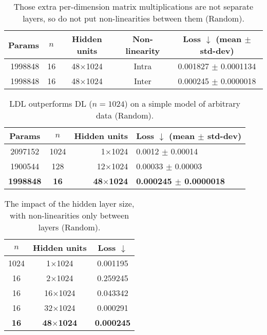 \documentclass{article}
\begin{document}
\begin{table}
\begin{center}
\begin{tabular}{rcccc}
\hline
Params & $n$ & Hidden units & Non-linearity & Loss $\downarrow$ (mean $\pm$ std-dev) \\
\hline
1998848 & 16 & 48$\times$1024 & Intra & 0.001827 $\pm$ 0.0001134 \\
1998848 & 16 & 48$\times$1024 & Inter & 0.000245 $\pm$ 0.0000018 \\
\hline
\end{tabular}
\end{center}
\caption{Those extra per-dimension matrix multiplications are not separate layers, so do not put non-linearities between them (Random).}
\label{LDLintraVSinter}
\end{table}

\begin{table}
\begin{center}
\begin{tabular}{ccrl}
\hline
Params & $n$ & Hidden units & Loss $\downarrow$ (mean $\pm$ std-dev) \\
\hline
2097152 & 1024 & 1$\times$1024 & 0.0012 $\pm$ 0.00014 \\
1900544 & 128 & 12$\times$1024 & 0.00033 $\pm$ 0.00003 \\
\textbf{1998848} & \textbf{16} & \textbf{48$\times$1024} & \textbf{0.000245 $\pm$ 0.0000018} \\
\hline
\end{tabular}
\end{center}
\caption{LDL outperforms DL ($n=1024$) on a simple model of arbitrary data (Random).}
\label{randomLDLvsDL}
\end{table}

\begin{table}
\begin{center}
\begin{tabular}{ccc}
\hline
$n$ & Hidden units & Loss $\downarrow$ \\
\hline
1024 & 1$\times$1024 & 0.001195 \\
\hline
16 & 2$\times$1024 & 0.259245 \\
16 & 16$\times$1024 & 0.043342 \\
16 & 32$\times$1024 & 0.000291 \\
\textbf{16} & \textbf{48$\times$1024} & \textbf{0.000245} \\
\hline
\end{tabular}
\end{center}
\caption{The impact of the hidden layer size, with non-linearities only between layers (Random).}
\label{LDLscaling}
\end{table}
\end{document}
